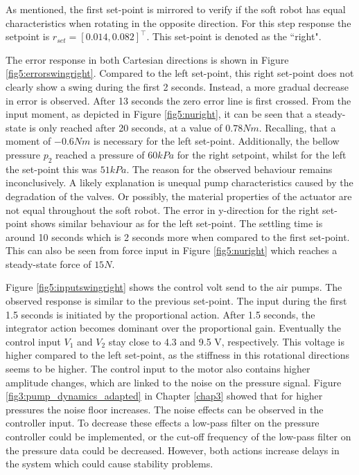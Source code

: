 As mentioned, the first set-point is mirrored to verify if the soft robot has equal characteristics when rotating in the opposite direction. For this step response the setpoint is $r_{set} = [0.014,0.082]^\top$. This set-point is denoted as the ``right".


The error response in both Cartesian directions is shown in Figure \ref{fig5:errorswingright}. Compared to the left set-point, this right set-point does not clearly show a swing during the first 2 seconds. Instead, a more gradual decrease in error is observed. After 13 seconds the zero error line is first crossed. From the input moment, as depicted in Figure \ref{fig5:nuright}, it can be seen that a steady-state is only reached after 20 seconds, at a value of $0.78 Nm$. Recalling, that a moment of $-0.6 Nm$ is necessary for the left set-point. Additionally, the bellow pressure $p_2$ reached a pressure of $60 kPa$ for the right setpoint, whilst for the left the set-point this was $51 kPa$. The reason for the observed behaviour remains inconclusively. A likely explanation is unequal pump characteristics caused by the degradation of the valves. Or possibly, the material properties of the actuator are not equal throughout the soft robot. The error in y-direction for the right set-point shows similar behaviour as for the left set-point. The settling time is around 10 seconds which is 2 seconds more when compared to the first set-point. This can also be seen from force input in Figure \ref{fig5:nuright} which reaches a steady-state force of $15 N$.

Figure \ref{fig5:inputswingright} shows the control volt send to the air pumps. The observed response is similar to the previous set-point. The input during the first 1.5 seconds is initiated by the proportional action. After 1.5 seconds, the integrator action becomes dominant over the proportional gain. Eventually the control input $V_1$ and $V_2$ stay close to 4.3 and 9.5 V, respectively. This voltage is higher compared to the left set-point, as the stiffness in this rotational directions seems to be higher. The control input to the motor also contains higher amplitude changes, which are linked to the noise on the pressure signal. Figure \ref{fig3:pump_dynamics_adapted} in Chapter \ref{chap3} showed that for higher pressures the noise floor increases. The noise effects can be observed in the controller input. To decrease these effects a low-pass filter on the pressure controller could be implemented, or the cut-off frequency of the low-pass filter on the pressure data could be decreased. However, both actions increase delays in the system which could cause stability problems.


